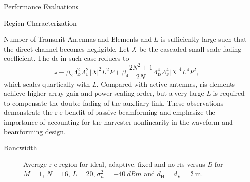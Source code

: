 \begin{section}{Performance Evaluations}
\begin{subsection}{ Region Characterization}
\begin{subsubsection}{Number of Transmit Antennas and  Elements}
and $L$ is sufficiently large such that the direct channel becomes negligible. Let $X$ be the cascaded small-scale fading coefficient. The \gls{dc} in such case reduces to
			\begin{equation}
				z = \beta_2 \Lambda_{\mathrm{B}}^2 \Lambda_{\mathrm{F}}^2 \lvert X \rvert^2 L^2 P + \beta_4 \frac{2N^2 + 1}{2N} \Lambda_{\mathrm{B}}^4 \Lambda_{\mathrm{F}}^4 \lvert X \rvert^4 L^4 P^2,
			\end{equation}
			which scales quartically with $L$. Compared with active antennas, \gls{ris} elements achieve higher array gain and power scaling order, but a very large $L$ is required to compensate the double fading of the auxiliary link. These observations demonstrate the \gls{r-e} benefit of passive beamforming and emphasize the importance of accounting for the harvester nonlinearity in the waveform and beamforming design.
		\end{subsubsection}

		\begin{subsubsection}{Bandwidth}
			\begin{figure}[H]
				\centering
				\subfloat[$B=\qty{1}{\MHz}$\label{fg:re_irs_1mhz}]{
					\resizebox{0.45\columnwidth}{!}{
						
					}
				}
				\subfloat[$B=\qty{10}{\MHz}$\label{fg:re_irs_10mhz}]{
					\resizebox{0.45\columnwidth}{!}{
						
					}
				}
				\caption{Average \gls{r-e} region for ideal, adaptive, fixed and no \gls{ris} versus $B$ for $M=1$, $N=16$, $L=20$, $\sigma_n^2=\qty{-40}{dBm}$ and $d_{\mathrm{H}}=d_{\mathrm{V}}=\qty{2}{\meter}$.}
			\end{figure}


\end{subsubsection}
\end{subsection}
\end{section}
